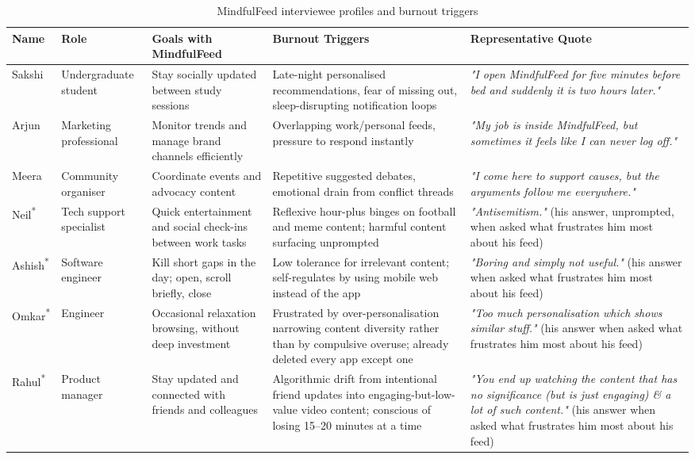 \documentclass[11pt]{article}
\begin{document}
\begin{table}[h]
\centering
\caption{MindfulFeed interviewee profiles and burnout triggers}
\label{tab:profiles_mindfulfeed}
\small
\begin{tabular}{p{1.8cm}p{2.6cm}p{3.2cm}p{3.2cm}p{5.5cm}}
\hline
\textbf{Name} & \textbf{Role} & \textbf{Goals with MindfulFeed} & \textbf{Burnout Triggers} & \textbf{Representative Quote} \\
\hline
Sakshi & Undergraduate student & Stay socially updated between study sessions & Late-night personalised recommendations, fear of missing out, sleep-disrupting notification loops & \textit{"I open MindfulFeed for five minutes before bed and suddenly it is two hours later."} \\
Arjun & Marketing professional & Monitor trends and manage brand channels efficiently & Overlapping work/personal feeds, pressure to respond instantly & \textit{"My job is inside MindfulFeed, but sometimes it feels like I can never log off."} \\
Meera & Community organiser & Coordinate events and advocacy content & Repetitive suggested debates, emotional drain from conflict threads & \textit{"I come here to support causes, but the arguments follow me everywhere."} \\
Neil\textsuperscript{*} & Tech support specialist & Quick entertainment and social check-ins between work tasks & Reflexive hour-plus binges on football and meme content; harmful content surfacing unprompted & \textit{"Antisemitism."} (his answer, unprompted, when asked what frustrates him most about his feed) \\
Ashish\textsuperscript{*} & Software engineer & Kill short gaps in the day; open, scroll briefly, close & Low tolerance for irrelevant content; self-regulates by using mobile web instead of the app & \textit{"Boring and simply not useful."} (his answer when asked what frustrates him most about his feed) \\
Omkar\textsuperscript{*} & Engineer & Occasional relaxation browsing, without deep investment & Frustrated by over-personalisation narrowing content diversity rather than by compulsive overuse; already deleted every app except one & \textit{"Too much personalisation which shows similar stuff."} (his answer when asked what frustrates him most about his feed) \\
Rahul\textsuperscript{*} & Product manager & Stay updated and connected with friends and colleagues & Algorithmic drift from intentional friend updates into engaging-but-low-value video content; conscious of losing 15--20 minutes at a time & \textit{"You end up watching the content that has no significance (but is just engaging) \& a lot of such content."} (his answer when asked what frustrates him most about his feed) \\

\end{tabular}
\end{table}
\end{document}
